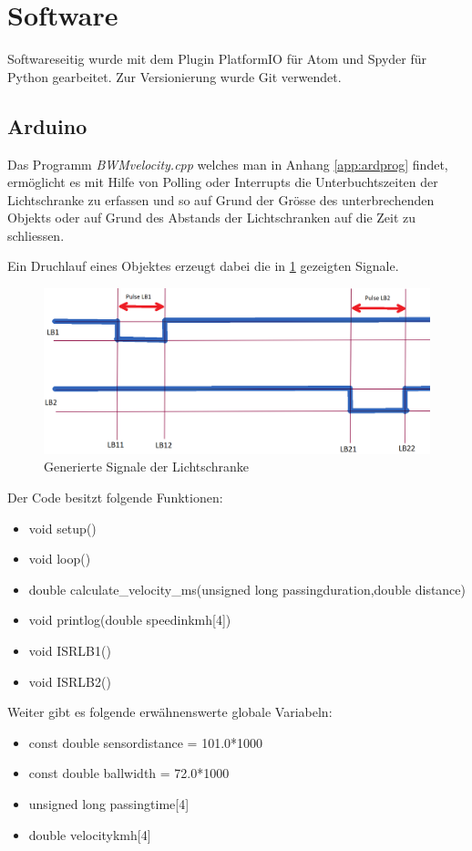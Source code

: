 \section{Software}
Softwareseitig wurde mit dem Plugin PlatformIO für Atom und Spyder für Python gearbeitet. Zur Versionierung wurde Git verwendet.
\subsection{Arduino}
Das Programm \textit{BWMvelocity.cpp} welches man in Anhang \ref{app:ardprog} findet, ermöglicht es mit Hilfe von Polling oder Interrupts die Unterbuchtszeiten der Lichtschranke zu erfassen und so auf Grund der Grösse des unterbrechenden Objekts oder auf Grund des Abstands der Lichtschranken auf die Zeit zu schliessen.

Ein Druchlauf  eines Objektes erzeugt dabei die in \ref{fig:ArdSigs} gezeigten Signale.
\begin{figure}[ht]
    \centering
    \includegraphics[width=\textwidth]{images/signals}
    \caption{Generierte Signale der Lichtschranke}
    \label{fig:ArdSigs}
\end{figure}

Der  Code besitzt folgende Funktionen:
\begin{itemize}
    \item void setup()
    \item void loop()
    \item double calculate\_velocity\_ms(unsigned long passingduration,double distance)
    \item void printlog(double speedinkmh[4])
    \item void ISRLB1()
    \item void ISRLB2()
\end{itemize}

Weiter  gibt es folgende erwähnenswerte globale Variabeln:
\begin{itemize}
    \item const double sensordistance = 101.0*1000
    \item const double ballwidth = 72.0*1000
    \item unsigned long passingtime[4]
    \item double velocitykmh[4]
\end{itemize}

